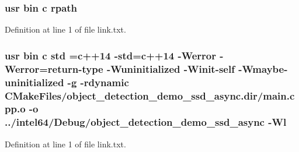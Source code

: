 \subsubsection[{\texorpdfstring{rpath}{rpath}}]{\setlength{\rightskip}{0pt plus 5cm}usr bin {\bf c} rpath}\hypertarget{object__detection__demo__ssd__async_2CMakeFiles_2object__detection__demo__ssd__async_8dir_2link_8txt_ab9d7fd7120fafa2118a4e08c1df697c7}{}\label{object__detection__demo__ssd__async_2CMakeFiles_2object__detection__demo__ssd__async_8dir_2link_8txt_ab9d7fd7120fafa2118a4e08c1df697c7}


Definition at line 1 of file link.\+txt.

\subsubsection[{\texorpdfstring{std}{std}}]{\setlength{\rightskip}{0pt plus 5cm}usr bin {\bf c} std ={\bf c}++14 -\/std={\bf c}++14 -\/Werror -\/Werror=return-\/type -\/Wuninitialized -\/Winit-\/self -\/Wmaybe-\/uninitialized -\/g -\/rdynamic C\+Make\+Files/object\+\_\+detection\+\_\+demo\+\_\+ssd\+\_\+async.\+dir/main.\+cpp.\+o -\/o ../intel64/Debug/object\+\_\+detection\+\_\+demo\+\_\+ssd\+\_\+async -\/{\bf Wl}}\hypertarget{object__detection__demo__ssd__async_2CMakeFiles_2object__detection__demo__ssd__async_8dir_2link_8txt_a1ccfea5f558575a112db71eeb271fabf}{}\label{object__detection__demo__ssd__async_2CMakeFiles_2object__detection__demo__ssd__async_8dir_2link_8txt_a1ccfea5f558575a112db71eeb271fabf}


Definition at line 1 of file link.\+txt.


